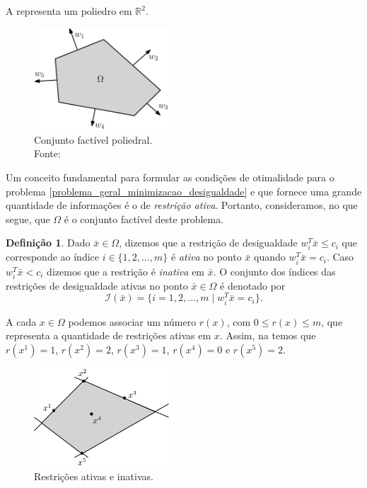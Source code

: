 \documentclass[12pt,a4paper]{scrartcl}
\def\RR{\mathds{R}}
\def\xbar{\bar{x}}
\theoremstyle{definition}%
\newtheorem{defi}{Definição}
\begin{document}
A  representa um poliedro em $\RR^{2}$.

\begin{figure}[!ht] 
	\centering
	\includegraphics[width=0.45\textwidth]{conjunto_factivel_poliedral}
	\caption{Conjunto factível poliedral. \\ Fonte: \textcite{Ana1994} \label{fig:regiao_factivel_poliedro}}
\end{figure}

Um conceito fundamental para formular as condições de otimalidade para o problema \eqref{problema_geral_minimizacao_desigualdade} e que fornece uma grande quantidade de informações é o de \emph{restrição ativa}. Portanto, consideramos, no que segue, que $\Omega$ é o conjunto factível deste problema.

\begin{defi}
Dado $\xbar \in \Omega$, dizemos que a restrição de desigualdade $w_{i}^{T}\bar{x} \leq c_{i}$ que corresponde ao índice $i\in \{ 1,2, \ldots , m\}$ é \emph{ativa} no ponto $\xbar$ quando $w_{i}^{T}\bar{x} = c_{i}$. Caso $w_{i}^{T}\bar{x} < c_{i}$ dizemos que a restrição é \emph{inativa} em $\xbar$. O conjunto dos índices das restrições de desigualdade ativas no ponto $\xbar \in \Omega$ é denotado por
\[
\mathcal{I} (\xbar) = \{ i = 1,2, \ldots , m \mid w_{i}^{T}\bar{x} = c_{i} \} .
\]
\end{defi} 


A cada $x\in \Omega$ podemos associar um número $r(x)$, com $0\leq r(x) \leq m$, que representa a quantidade de restrições ativas em $x$. Assim, na  temos que $r(x^{1}) = 1$, $r(x^{2}) = 2$, $r(x^{3}) = 1$, $r(x^{4}) = 0$ e $r(x^{5}) = 2$.

\begin{figure}[!ht] 
	\centering
	\includegraphics[width=0.45\textwidth]{restricoes_ativas}
	\caption{Restrições ativas e inativas. \label{fig:restricoes_ativas}}
\end{figure}
\end{document}
